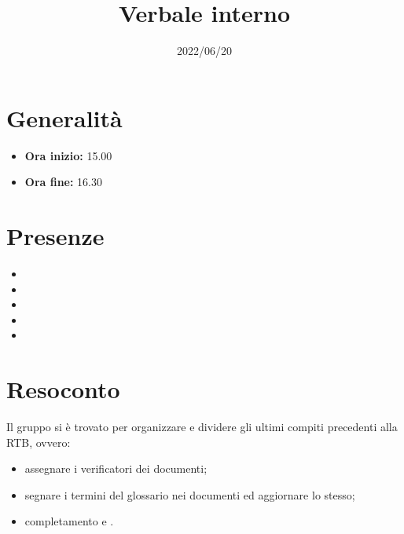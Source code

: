 \documentclass{classes/base}
\title{Verbale interno}
\date{2022/06/20}
\author{\marcob}
\renewcommand{\maketitle}{
    
}
\begin{document}
    \maketitle

    \section*{Generalità}
    \begin{itemize}
        \item \textbf{Ora inizio:} 15.00
        \item \textbf{Ora fine:} 16.30
    \end{itemize}
    
    \section*{Presenze}
    \begin{itemize}
    	\item \angela
        \item \marcob
        \item \matteo
        \item \marcov
        \item \giulio
    \end{itemize}

    \section*{Resoconto}
    Il gruppo si è trovato per organizzare e dividere gli ultimi compiti precedenti alla RTB, ovvero:
    \begin{itemize}
        \item assegnare i verificatori dei documenti;
        \item segnare i termini del glossario nei documenti ed aggiornare lo stesso;
        \item completamento \NdP{} e \PdP{}.
    \end{itemize}
\end{document}
